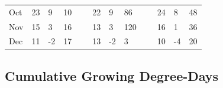 \documentclass[agronomy,article,submit,moreauthors,pdftex,10pt,a4paper]{mdpi}
\theoremstyle{mdpi}
\newcounter{re}
\theoremstyle{mdpidefinition}
\begin{document}
\begin{table}
\begin{tabular}{llllllllllll}
Oct                    & 23                                                                       & 9                                                                        & 10                                                                      & ~ & 22                                                                       & 9                                                                        & 86                                                                      & ~ & 24                                                                      & 8                                                                        & 48                                                                      \\
Nov                    & 15                                                                       & 3                                                                        & 16                                                                      & ~ & 13                                                                       & 3                                                                        & 120                                                                     & ~ & 16                                                                      & 1                                                                        & 36                                                                      \\
Dec                    & 11                                                                       & -2                                                                       & 17                                                                      & ~ & 13                                                                       & -2                                                                       & 3                                                                       & ~ & 10                                                                      & -4                                                                       & 20                                                                      \\
\bottomrule
\end{tabular}
\end{table}


\subsection{Cumulative Growing Degree-Days}
\end{document}
